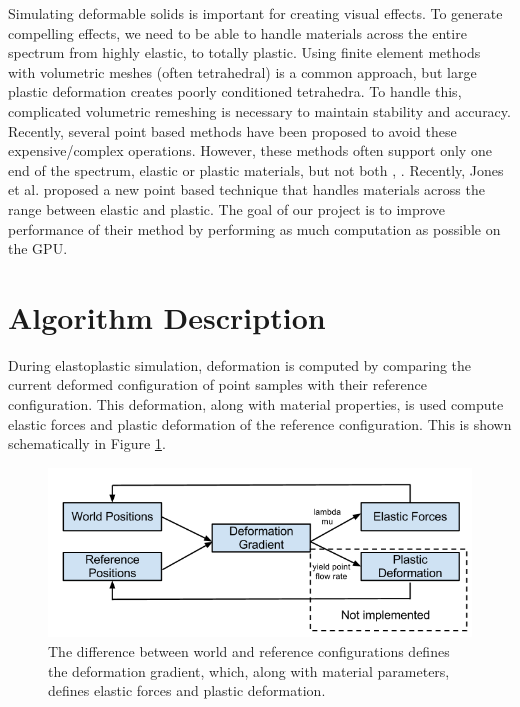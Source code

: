 \documentclass[cameraready]{acmsiggraph-awb}
\begin{document}
Simulating deformable solids is important for creating visual effects.  To generate compelling effects, we need to be able to handle materials across the entire spectrum from highly elastic, to totally plastic.  Using finite element methods with volumetric meshes (often tetrahedral) is a common approach, but large plastic deformation creates poorly conditioned tetrahedra.  To handle this, complicated volumetric remeshing is necessary to maintain stability and accuracy.  Recently, several point based methods have been proposed to avoid these expensive/complex operations.  However, these methods often support only one end of the spectrum, elastic or plastic materials, but not both  \cite{Mueller:2004:PBA}, \cite{Gerszewski:2009:APB}.  Recently, Jones et al. \cite{us} proposed a new point based technique that handles materials across the range between elastic and plastic.  The goal of our project is to improve performance of their method by performing as much computation as possible on the GPU.  

\section{Algorithm Description}

During elastoplastic simulation, deformation is computed by comparing the current deformed configuration of point samples with their reference configuration.  This deformation, along with material properties, is used compute elastic forces and plastic deformation of the reference configuration.  This is shown schematically in Figure \ref{fig:defGrad}.
\begin{figure}
\begin{centering}
\includegraphics[width = \textwidth]{Figures/algSchematic.png}
\caption{The difference between world and reference configurations defines the deformation gradient, which, along with material parameters, defines elastic forces and plastic deformation.}
\label{fig:defGrad}
\end{centering}
\end{figure}
\end{document}

